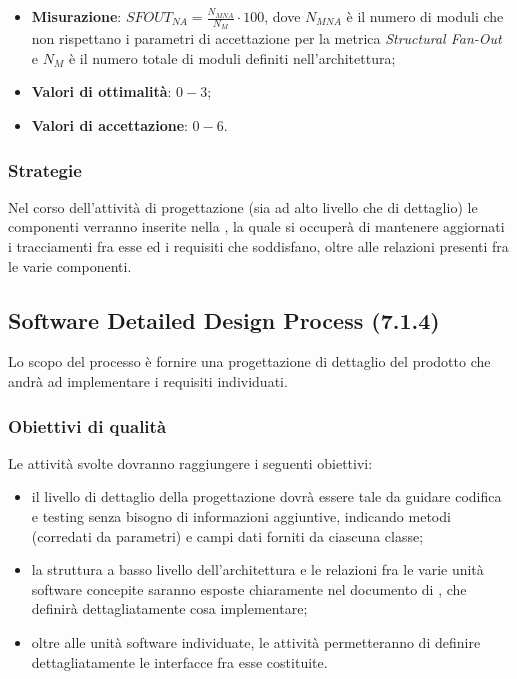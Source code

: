 \begin{itemize}
\item \textbf{Misurazione}: $SFOUT_{NA}=\frac{N_{MNA}}{N_{M}} \cdot 100$, dove $N_{MNA}$ è il numero di moduli che non rispettano i parametri di accettazione per la metrica \textit{Structural Fan-Out} e $N_{M}$ è il numero totale di moduli definiti nell'architettura;
\item \textbf{Valori di ottimalità}: $0 - 3$;
\item \textbf{Valori di accettazione}: $0 - 6$.
\end{itemize}
\subsubsection{Strategie}
Nel corso dell'attività di progettazione (sia ad alto livello che di dettaglio) le componenti verranno inserite nella  \pragmadb, la quale si occuperà di mantenere aggiornati i tracciamenti fra esse ed i requisiti che soddisfano, oltre alle relazioni presenti fra le varie componenti.
\subsection{Software Detailed Design Process (7.1.4)}
\label{sySoDetailDesign}
Lo scopo del processo è fornire una progettazione di dettaglio del prodotto che andrà ad implementare i requisiti individuati.
\subsubsection{Obiettivi di qualità}
Le attività svolte dovranno raggiungere i seguenti obiettivi:
\begin{itemize}
\item il livello di dettaglio della progettazione dovrà essere tale da guidare codifica e testing senza bisogno di informazioni aggiuntive, indicando metodi (corredati da parametri) e campi dati forniti da ciascuna classe;
\item la struttura a basso livello dell'architettura e le relazioni fra le varie unità software concepite saranno esposte chiaramente nel documento di \DP, che definirà dettagliatamente cosa implementare;
\item oltre alle unità software individuate, le attività permetteranno di definire dettagliatamente le interfacce fra esse costituite.
\end{itemize}
